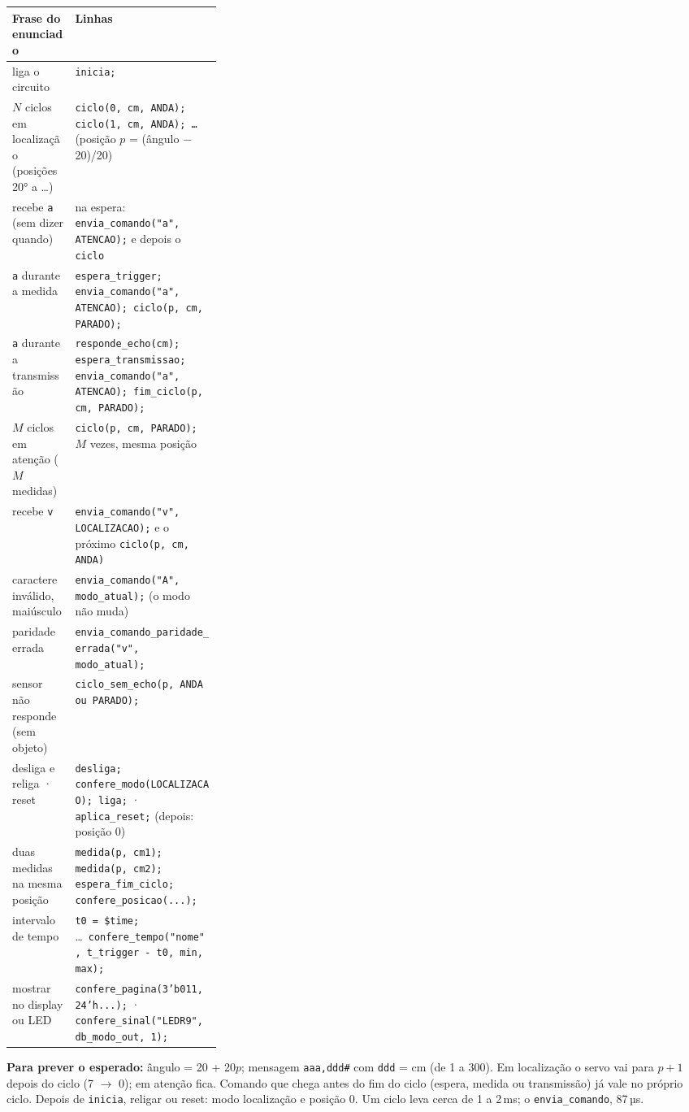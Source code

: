 \documentclass[9pt,a4paper]{extarticle}
\newcommand{\s}[1]{\texttt{#1}}          %
\begin{document}
\begin{tabularx}{\linewidth}{@{}>{\raggedright\arraybackslash}p{0.30\linewidth} Y@{}}
\toprule
Frase do enunciado & Linhas \\
\midrule
liga o circuito & \s{inicia;} \\
$N$ ciclos em localização (posições 20° a \ldots) & \s{ciclo(0, cm, ANDA); ciclo(1, cm, ANDA); \ldots} (posição $p$ = (ângulo $-$ 20)/20) \\
recebe \s{a} (sem dizer quando) & na espera: \s{envia\_comando("a", ATENCAO);} e depois o \s{ciclo} \\
\s{a} durante a medida & \s{espera\_trigger; envia\_comando("a", ATENCAO); ciclo(p, cm, PARADO);} \\
\s{a} durante a transmissão & \s{responde\_echo(cm); espera\_transmissao; envia\_comando("a", ATENCAO); fim\_ciclo(p, cm, PARADO);} \\
$M$ ciclos em atenção ($M$ medidas) & \s{ciclo(p, cm, PARADO);} $M$ vezes, mesma posição \\
recebe \s{v} & \s{envia\_comando("v", LOCALIZACAO);} e o próximo \s{ciclo(p, cm, ANDA)} \\
caractere inválido, maiúsculo & \s{envia\_comando("A", modo\_atual);} (o modo não muda) \\
paridade errada & \s{envia\_comando\_paridade\_errada("v", modo\_atual);} \\
sensor não responde (sem objeto) & \s{ciclo\_sem\_echo(p, ANDA ou PARADO);} \\
desliga e religa · reset & \s{desliga; confere\_modo(LOCALIZACAO); liga;} · \s{aplica\_reset;} (depois: posição 0) \\
duas medidas na mesma posição & \s{medida(p, cm1); medida(p, cm2); espera\_fim\_ciclo; confere\_posicao(...);} \\
intervalo de tempo & \s{t0 = \$time;} \ldots\ \s{confere\_tempo("nome", t\_trigger - t0, min, max);} \\
mostrar no display ou LED & \s{confere\_pagina(3'b011, 24'h...);} · \s{confere\_sinal("LEDR9", db\_modo\_out, 1);} \\
\bottomrule
\end{tabularx}

\textbf{Para prever o esperado:} ângulo = 20 + 20$p$; mensagem \s{aaa,ddd\#} com
\s{ddd} = cm (de 1 a 300). Em localização o servo vai para $p+1$ depois do ciclo (7 $\to$
0); em atenção fica. Comando que chega antes do fim do ciclo (espera, medida ou
transmissão) já vale no próprio ciclo. Depois de \s{inicia}, religar ou reset: modo
localização e posição 0. Um ciclo leva cerca de 1 a 2\,ms; o \s{envia\_comando}, 87\,µs.
\end{document}

